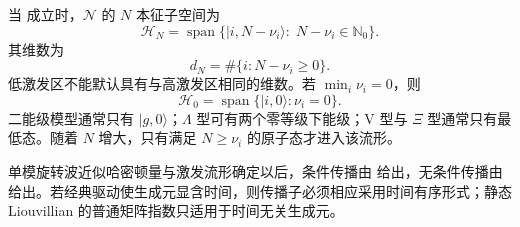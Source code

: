 当 成立时，$\mathcal N$ 的 $N$ 本征子空间为
\begin{equation}
\mathcal H_N
=\operatorname{span}
\{|i,N-\nu_i\rangle:\;N-\nu_i\in\mathbb N_0\}.
\label{eq:phys-oqs-manifold-span}
\end{equation}
其维数为
\begin{equation}
d_N=\#\{i:N-\nu_i\ge0\}.
\label{eq:phys-oqs-manifold-dimension}
\end{equation}
低激发区不能默认具有与高激发区相同的维数。若 $\min_i\nu_i=0$，则
\[
\mathcal H_0
=\operatorname{span}\{|i,0\rangle:\nu_i=0\}.
\]
二能级模型通常只有 $|g,0\rangle$；$\Lambda$ 型可有两个零等级下能级；V 型与 $\Xi$ 型通常只有最低态。随着 $N$ 增大，只有满足 $N\ge\nu_i$ 的原子态才进入该流形。

单模旋转波近似哈密顿量与激发流形确定以后，条件传播由 给出，无条件传播由 给出。若经典驱动使生成元显含时间，则传播子必须相应采用时间有序形式；静态 Liouvillian 的普通矩阵指数只适用于时间无关生成元。

